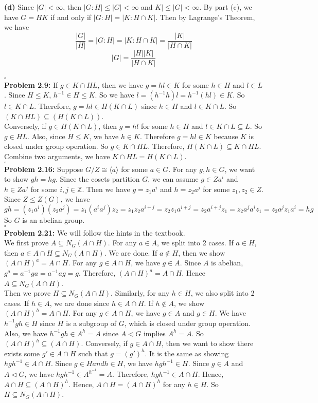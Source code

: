 \documentclass[12pt]{amsart}
\newcommand{\Z}{\mathbb{Z}}
\begin{document}
    \textbf{(d)} Since $|G|< \infty$, then $|G:H|\leq |G|<\infty$ and $K|\leq |G|<\infty$. By part (c), we have $G=HK$ if and only if $|G:H|=|K:H\cap K|$. Then by Lagrange's Theorem, we have 
    \[\frac{|G|}{|H|}=|G:H|=|K:H\cap K|=\frac{|K|}{|H\cap K|}\]
    \[|G|=\frac{|H||K|}{|H\cap K|}\]
    \\\phantom{qed}\hfill$\square$\\
    \textbf{Problem 2.9:} If $g\in K\cap HL$, then we have $g=hl\in K$ for some $h\in H$ and $l\in L$. Since $H\leq K$, $h^{-1}\in H\leq K$. So we have $l=(h^{-1}h)l=h^{-1}(hl)\in K$. So $l\in K\cap L$. Therefore, $g=hl\in H(K\cap L)$ since $h\in H$ and $l\in K\cap L$. So $(K\cap HL)\subseteq (H(K\cap L))$.\\
    Conversely, if $g\in H(K\cap L)$, then $g=hl$ for some $h\in H$ and $l\in K\cap L\subseteq L$. So $g\in HL$. Also, since $H\leq K$, we have $h\in K$. Therefore $g=hl\in K$ because $K$ is closed under group operation. So $g\in K\cap HL$. Therefore, $H(K\cap L)\subseteq K\cap HL$.\\
    Combine two arguments, we have $K\cap HL= H(K\cap L)$.
    \\\phantom{qed}\hfill$\square$\\
    \textbf{Problem 2.16:} Suppose $G/Z\cong\langle a \rangle$ for some $a\in G$. For any $g,h\in G$, we want to show $gh=hg$. Since the cosets partition $G$, we can assume $g\in Za^i$ and $h\in Za^j$ for some $i,j\in \Z$. Then we have $g=z_1a^i$ and $h=z_2a^j$ for some $z_1,z_2\in Z$. Since $Z\leq Z(G)$, we have 
    \[gh=(z_1a^i)(z_2a^j)=z_1(a^{i}a^j)z_2=z_1z_2a^{i+j}=z_2z_1a^{i+j}=z_2a^{i+j}z_1=z_2a^ja^iz_1=z_2a^jz_1a^i=hg\]
    So $G$ is an abelian group.
    \\\phantom{qed}\hfill$\square$\\
    \textbf{Problem 2.21:} We will follow the hints in the textbook.\\
    We first prove $A\subseteq N_G(A\cap H)$. For any $a\in A$, we split into 2 cases. If $a\in H$, then $a\in A\cap H\subseteq N_G(A\cap H)$. We are done. If $a\notin H$, then we show $(A\cap H)^a=A\cap H$. For any $g\in A\cap H$, we have $g\in A$. Since $A$ is abelian, $g^a=a^{-1}ga=a^{-1}ag=g$. Therefore, $(A\cap H)^a=A\cap H$. Hence $A\subseteq N_G(A\cap H)$.\\
    Then we prove $H\subseteq N_G(A\cap H)$. Similarly, for any $h\in H$, we also split into 2 cases. If $h\in A$, we are done since $h\in A\cap H$. If $h\notin A$, we show $(A\cap H)^h=A\cap H$. For any $g\in A\cap H$, we have $g\in A$ and $g\in H$. We have $h^{-1}gh\in H$ since $H$ is a subgroup of $G$, which is closed under group operation. Also, we have $h^{-1}gh\in A^h=A$ since $A\triangleleft G$ implies $A^h=A$. So $(A\cap H)^h\subseteq (A\cap H)$. Conversely, if $g\in A\cap H$, then we want to show there exists some $g'\in A\cap H$ such that $g=(g')^h$. It is the same as showing $hgh^{-1}\in A\cap H$. Since $g\in H and h\in H$, we have $hgh^{-1}\in H$. Since $g\in A$ and $A\triangleleft G$, we have $hgh^{-1}\in A^{h^{-1}}=A$. Therefore, $hgh^{-1}\in A\cap H$. Hence, $A\cap H\subseteq (A\cap H)^h$. Hence, $A\cap H= (A\cap H)^h$ for any $h\in H$. So $H\subseteq N_G(A\cap H)$.\\
\end{document}
